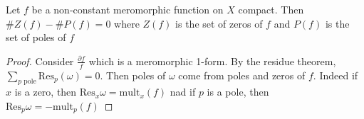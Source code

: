 \begin{corollary}{}\label{cor:ZP0}
    Let \(f\) be a non-constant meromorphic function on \(X\) compact.
    Then \(\# Z{(f)} - \# P{(f)} = 0\) where \(Z{(f)}\) is the set of zeros of
    \(f\) and \(P{(f)}\) is the set of poles of \(f\) 
\end{corollary}
\begin{proof}{}
    Consider \(\frac{\partial f}{f}\) which is a meromorphic 1-form. By the
    residue theorem, \(\sum_{p \text{ pole}} \mathrm{Res}_p{(\omega)} = 0\).
    Then poles of \(\omega\) come from poles and zeros of \(f\). Indeed if \(x\)
    is a zero, then \(\mathrm{Res}_x \omega = \mathrm{mult}_x {(f)}\) nad if
    \(p\) is a pole, then \(\mathrm{Res}_p \omega = - \mathrm{mult}_p{(f)}\) 
\end{proof}

